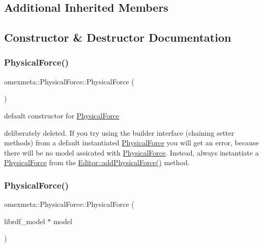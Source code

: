 \subsection*{Additional Inherited Members}


\subsection{Constructor \& Destructor Documentation}
\mbox{\label{classomexmeta_1_1PhysicalForce_ad5b43ea5489891c45f5ebc4c9b62e44e}} 
\subsubsection{\texorpdfstring{Physical\+Force()}{PhysicalForce()}\hspace{0.1cm}{\footnotesize\ttfamily [1/3]}}
{\footnotesize\ttfamily omexmeta\+::\+Physical\+Force\+::\+Physical\+Force (\begin{DoxyParamCaption}{ }\end{DoxyParamCaption})\hspace{0.3cm}{\ttfamily [delete]}}



default constructor for \hyperlink{classomexmeta_1_1PhysicalForce}{Physical\+Force} 

deliberately deleted. If you try using the builder interface (chaining setter methods) from a default instantiated \hyperlink{classomexmeta_1_1PhysicalForce}{Physical\+Force} you will get an error, because there will be no model assicated with \hyperlink{classomexmeta_1_1PhysicalForce}{Physical\+Force}. Instead, always instantiate a \hyperlink{classomexmeta_1_1PhysicalForce}{Physical\+Force} from the \hyperlink{classomexmeta_1_1Editor_a7833e03995f6323109c2db8d59104f6c}{Editor\+::add\+Physical\+Force()} method. \mbox{\label{classomexmeta_1_1PhysicalForce_a673e6810fe969bcd087ab88c62e5e041}} 
\subsubsection{\texorpdfstring{Physical\+Force()}{PhysicalForce()}\hspace{0.1cm}{\footnotesize\ttfamily [2/3]}}
{\footnotesize\ttfamily omexmeta\+::\+Physical\+Force\+::\+Physical\+Force (\begin{DoxyParamCaption}\item[{librdf\+\_\+model $\ast$}]{model }\end{DoxyParamCaption})\hspace{0.3cm}{\ttfamily [explicit]}}



